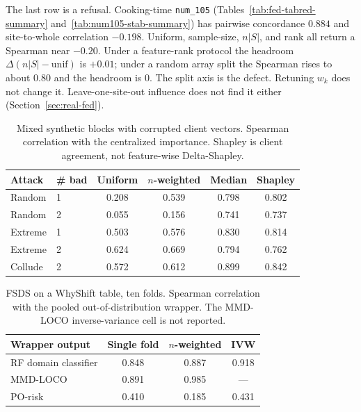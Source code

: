 The last row is a refusal.
Cooking-time \texttt{num\_105}
(Tables~\ref{tab:fed-tabred-summary} and~\ref{tab:num105-stab-summary})
has pairwise concordance \(0.884\) and site-to-whole correlation
\(-0.198\).
Uniform, sample-size, \(n|S|\), and rank all return a Spearman near
\(-0.20\).
Under a feature-rank protocol the headroom
\(\Delta(n|S|-\mathrm{unif})\) is \(+0.01\); under a random array split the
Spearman rises to about \(0.80\) and the headroom is \(0\).
The split axis is the defect.
Retuning \(w_k\) does not change it.
Leave-one-site-out influence does not find it either
(Section~\ref{sec:real-fed}).

\begin{table}[t]
\centering
\caption{Mixed synthetic blocks with corrupted client vectors.
Spearman correlation with the centralized importance.
Shapley is client agreement, not feature-wise Delta-Shapley.}
\label{tab:fed-vimp-attack}
\begin{tabular}{llcccc}
\toprule
Attack & \# bad & Uniform & \(n\)-weighted & Median & Shapley \\
\midrule
Random & 1 & 0.208 & 0.539 & 0.798 & 0.802 \\
Random & 2 & 0.055 & 0.156 & 0.741 & 0.737 \\
Extreme & 1 & 0.503 & 0.576 & 0.830 & 0.814 \\
Extreme & 2 & 0.624 & 0.669 & 0.794 & 0.762 \\
Collude & 2 & 0.572 & 0.612 & 0.899 & 0.842 \\
\bottomrule
\end{tabular}
\end{table}

\begin{table}[t]
\centering
\caption{FSDS on a WhyShift table, ten folds.
Spearman correlation with the pooled out-of-distribution wrapper.
The MMD-LOCO inverse-variance cell is not reported.}
\label{tab:pol-ood}
\begin{tabular}{lccc}
\toprule
Wrapper output & Single fold & \(n\)-weighted & IVW \\
\midrule
RF domain classifier & 0.848 & 0.887 & 0.918 \\
MMD-LOCO & 0.891 & 0.985 & --- \\
PO-risk & 0.410 & 0.185 & 0.431 \\
\bottomrule
\end{tabular}
\end{table}

